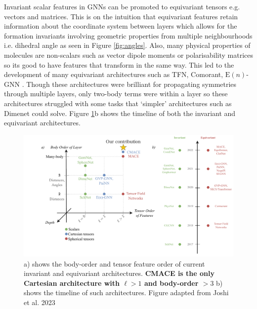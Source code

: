 Invariant scalar features in GNNs can be promoted to equivariant tensors e.g. vectors and matrices. This is on the intuition that equivariant features retain information about the coordinate system between layers which allows for the formation invariants involving geometric properties from multiple neighbourhoods i.e. dihedral angle as seen in Figure \ref{fig:angles}. Also, many physical properties of molecules are non-scalars such as vector dipole moments or polarisability matrices so its good to have features that transform in the same way. This led to the development of many equivariant architectures such as TFN, Comorant, $\mathrm E(n)$-GNN \cite{thomas2018tensor, anderson2019cormorant, satorras2021n}. Though these architectures were brilliant for propagating symmetries through multiple layers, only two-body terms were within a layer so these architectures struggled with some tasks that `simpler' architectures such as Dimenet could solve. Figure \ref{fig:map-timeline}b shows the timeline of both the invariant and equivariant architectures. 

\begin{figure}[H] %
    \centering
    \includegraphics[width=\textwidth]{figures/map-timeline.pdf}
    \caption{a) shows the body-order and tensor feature order of current invariant and equivariant architectures. \textbf{CMACE is the only Cartesian architecture with $\ell>1$ and body-order $>3$} b) shows the timeline of such architectures. Figure adapted from Joshi et al. 2023 \cite{joshi2023expressive}}
    \label{fig:map-timeline}
\end{figure}

